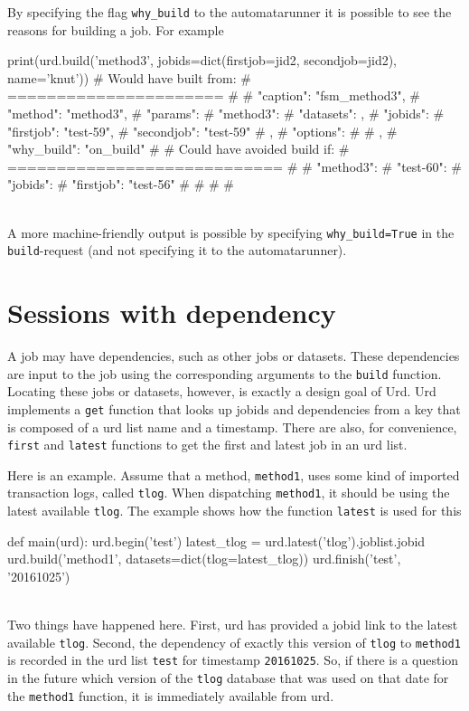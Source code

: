 By specifying the flag \texttt{why\_build} to the automatarunner it is
possible to see the reasons for building a job.  For example
\\
\begin{python}
  print(urd.build('method3', jobids=dict(firstjob=jid2, secondjob=jid2), name='knut'))
# Would have built from:
# ======================
# {
#     "caption": "fsm_method3", 
#     "method": "method3", 
#     "params": {
#         "method3": {
#             "datasets": {}, 
#             "jobids": {
#                 "firstjob": "test-59", 
#                 "secondjob": "test-59"
#             }, 
#             "options": {}
#         }
#     }, 
#     "why_build": "on_build"
# }
# Could have avoided build if:
# ============================
# {
#     "method3": {
#         "test-60": {
#             "jobids": {
#                 "firstjob": "test-56"
#             }
#         }
#     }
# }
\end{python}
\\
A more machine-friendly output is possible by specifying
\texttt{why\_build=True} in the \texttt{build}-request (and not
specifying it to the automatarunner).



\newpage
\section{Sessions with dependency}

A job may have dependencies, such as other jobs or datasets.  These
dependencies are input to the job using the corresponding arguments to
the \texttt{build} function.  Locating these jobs or datasets,
however, is exactly a design goal of Urd.  Urd implements a
\texttt{get} function that looks up jobids and dependencies from a key
that is composed of a urd list name and a timestamp.  There are also,
for convenience, \texttt{first} and \texttt{latest} functions to get
the first and latest job in an urd list.

Here is an example.  Assume that a method, \texttt{method1}, uses some
kind of imported transaction logs, called \texttt{tlog}.  When
dispatching \texttt{method1}, it should be using the latest available
\texttt{tlog}.  The example shows how the function \texttt{latest} is
used for this
\\
\begin{python}
def main(urd):
  urd.begin('test')
  latest_tlog = urd.latest('tlog').joblist.jobid
  urd.build('method1', datasets=dict(tlog=latest_tlog))
  urd.finish('test', '20161025')
\end{python}
\\
Two things have happened here.  First, urd has provided a jobid link
to the latest available \texttt{tlog}.  Second, the dependency of
exactly this version of \texttt{tlog} to \texttt{method1} is recorded
in the urd list \texttt{test} for timestamp \texttt{20161025}.  So, if
there is a question in the future which version of the \texttt{tlog}
database that was used on that date for the \texttt{method1} function,
it is immediately available from urd.

